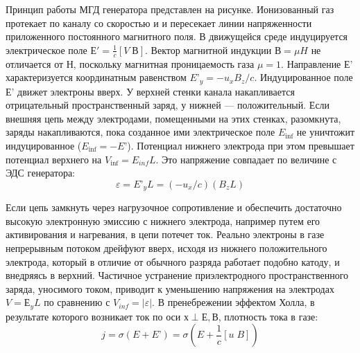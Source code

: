 \documentclass[10pt, a4paper]{article}
\begin{document}
\begin{figure}[h!]
\end{figure}

Принцип работы МГД генератора представлен на рисунке. Ионизованный газ протекает по каналу со скоростью и и пересекает линии напряженности приложенного постоянного магнитного поля. В движущейся среде индуцируется электрическое поле $Е' =\frac{1}{c} [V\; В]$. Вектор магнитной индукции $В =\mu H$ не отличается от $Н$, поскольку магнитная проницаемость газа $\mu=1$. Направление Е' характеризуется  
координатным равенством $E’_y=-u_x B_z / c $. Индуцированное поле Е' движет электроны вверх. У верхней  
стенки канала накапливается отрицательный пространственный заряд, у нижней — положительный. Если внешняя цепь между электродами, помещенными на этих стенках, разомкнута, заряды накапливаются, пока созданное ими электрическое поле $E_{\inf}$ не уничтожит индуцированное ($E_{\inf}=-E’$). Потенциал нижнего электрода при этом превышает потенциал верхнего на $V_{\inf} = E_{inf} L$. Это напряжение совпадает по величине с ЭДС генератора:
\begin{equation}
	\varepsilon=E’_{y}L=(-u_x /c)(B_z L)
\end{equation}

Если цепь замкнуть через нагрузочное сопротивление и обеспечить достаточно высокую электронную эмиссию с нижнего электрода, например путем его активирования и нагревания, в цепи потечет ток. Реально электроны в газе непрерывным потоком дрейфуют вверх, исходя из нижнего положительного электрода, который в отличие от обычного разряда работает подобно катоду, и внедряясь в верхний. Частичное устранение приэлектродного пространственного заряда, уносимого током, приводит к уменьшению напряжения на электродах $V= Е_{y} L$ по сравнению с $V_{inf}=|\varepsilon|$. В пренебрежении эффектом Холла, в результате которого возникает ток по оси $х \perp Е, В$, плотность тока в газе:
\begin{equation}
	j=\sigma(E+E’)=\sigma(E+\frac{1}{c}[u\;B])
\end{equation}
\end{document}
